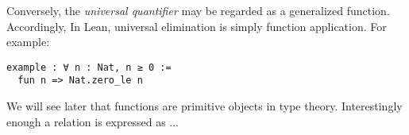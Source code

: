 Conversely, the \emph{universal quantifier} may be regarded as a generalized function.
Accordingly, In Lean, universal elimination is simply function application.
For example:
\begin{lstlisting}[language=lean]
example : ∀ n : Nat, n ≥ 0 :=
  fun n => Nat.zero_le n
\end{lstlisting}

We will see later that functions are primitive objects in type theory.
Interestingly enough a relation is expressed as ...


